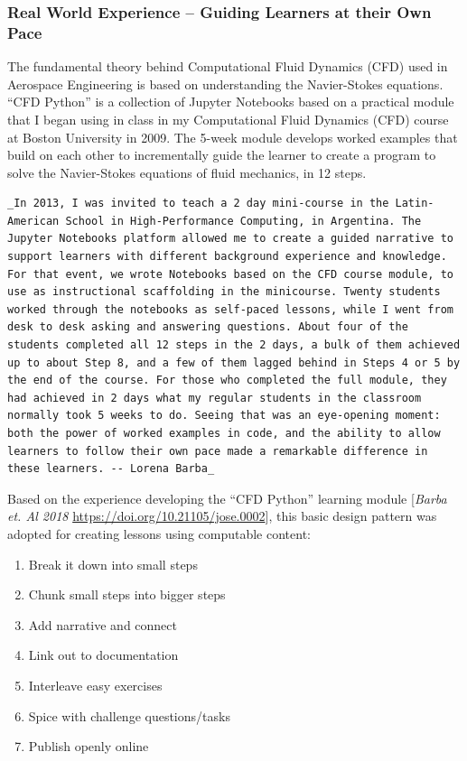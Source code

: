 \documentclass[]{book}
\providecommand{\tightlist}{%
  \setlength{\itemsep}{0pt}\setlength{\parskip}{0pt}}
\begin{document}
\subsubsection{Real World Experience -- Guiding Learners at their Own
Pace}\label{real-world-experience-guiding-learners-at-their-own-pace}

The fundamental theory behind Computational Fluid Dynamics (CFD) used in
Aerospace Engineering is based on understanding the Navier-Stokes
equations. ``CFD Python'' is a collection of Jupyter Notebooks based on
a practical module that I began using in class in my Computational Fluid
Dynamics (CFD) course at Boston University in 2009. The 5-week module
develops worked examples that build on each other to incrementally guide
the learner to create a program to solve the Navier-Stokes equations of
fluid mechanics, in 12 steps.

\begin{verbatim}
_In 2013, I was invited to teach a 2 day mini-course in the Latin-American School in High-Performance Computing, in Argentina. The Jupyter Notebooks platform allowed me to create a guided narrative to support learners with different background experience and knowledge. For that event, we wrote Notebooks based on the CFD course module, to use as instructional scaffolding in the minicourse. Twenty students worked through the notebooks as self-paced lessons, while I went from desk to desk asking and answering questions. About four of the students completed all 12 steps in the 2 days, a bulk of them achieved up to about Step 8, and a few of them lagged behind in Steps 4 or 5 by the end of the course. For those who completed the full module, they had achieved in 2 days what my regular students in the classroom normally took 5 weeks to do. Seeing that was an eye-opening moment: both the power of worked examples in code, and the ability to allow learners to follow their own pace made a remarkable difference in these learners. -- Lorena Barba_
\end{verbatim}

Based on the experience developing the ``CFD Python'' learning module
{[}\emph{Barba et. Al 2018 }\url{https://doi.org/10.21105/jose.0002}{]},
this basic design pattern was adopted for creating lessons using
computable content:

\begin{enumerate}
\def\labelenumi{\arabic{enumi}.}
\tightlist
\item
  Break it down into small steps
\item
  Chunk small steps into bigger steps
\item
  Add narrative and connect
\item
  Link out to documentation
\item
  Interleave easy exercises
\item
  Spice with challenge questions/tasks
\item
  Publish openly online
\end{enumerate}
\end{document}
